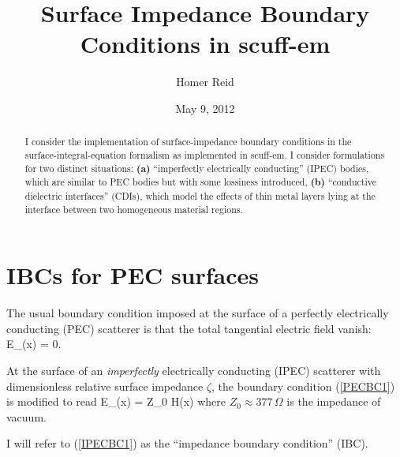 \documentclass{article}
\title{Surface Impedance Boundary Conditions in {\sc scuff-em}}
\author {Homer Reid}
\date {May 9, 2012}
\begin{document}
\maketitle

\pagestyle{myheadings}

\begin{abstract}
I consider the implementation of surface-impedance boundary
conditions in the surface-integral-equation formalism
as implemented in {\sc scuff-em}.
I consider formulations for two distinct situations:
\textbf{(a)} ``imperfectly electrically conducting'' (IPEC) bodies,
which are similar to PEC bodies but with some lossiness
introduced,
\textbf{(b)} ``conductive dielectric interfaces'' (CDIs),
which model the effects of thin metal layers lying at the 
interface between two homogeneous material regions.
\end{abstract}

\tableofcontents 

\newpage
\section{IBCs for PEC surfaces}

The usual boundary condition imposed at the surface of a
perfectly electrically conducting (PEC) scatterer is that
the total tangential electric field vanish:
 { \vb E_{\parallel}(\vb x) = 0. }

At the surface of an \textit{imperfectly} electrically conducting
(IPEC) scatterer with dimensionless relative surface impedance
$\zeta$, the boundary condition (\ref{PECBC1}) is modified to
read 
{
\vb E_{\parallel}(\vb x)
= \zeta Z_0 \times \vb H(\vb x)
}
where $Z_0\approx 377\,\Omega$ is the impedance of vacuum.

I will refer to (\ref{IPECBC1}) as the ``impedance boundary condition'' (IBC).

\newpage
\end{document}
